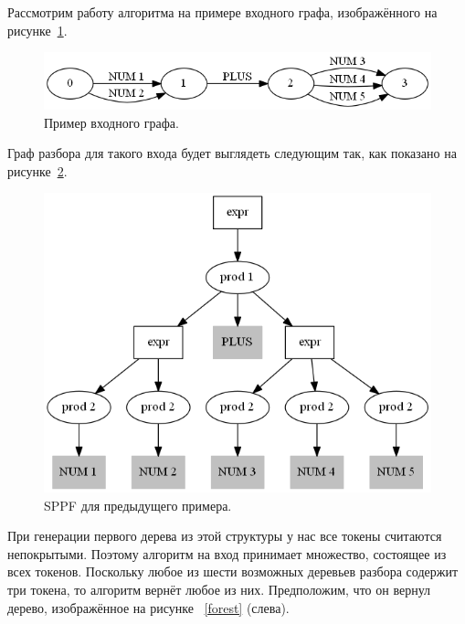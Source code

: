 Рассмотрим работу алгоритма на примере входного графа, изображённого на рисунке~\ref{illustration_input}.

\begin{figure}[t]
\centering
\includegraphics[width=\linewidth]{Ivanov/Pictures/illustration_input.png}
\caption{Пример входного графа.}
\label{illustration_input}
\end{figure}

Граф разбора для такого входа будет выглядеть следующим так, как показано на рисунке~\ref{illustration_sppf}.

\begin{figure}[t]
\centering
\includegraphics[width=\linewidth]{Ivanov/Pictures/illustration_sppf.png}
\caption{SPPF для предыдущего примера.}
\label{illustration_sppf}
\end{figure}

При генерации первого дерева из этой структуры у нас все токены считаются непокрытыми. Поэтому алгоритм на вход принимает множество, состоящее из всех токенов. Поскольку любое из шести возможных деревьев разбора содержит три токена, то алгоритм вернёт любое из них. Предположим, что он вернул дерево, изображённое на рисунке ~\ref{forest} (слева). 

